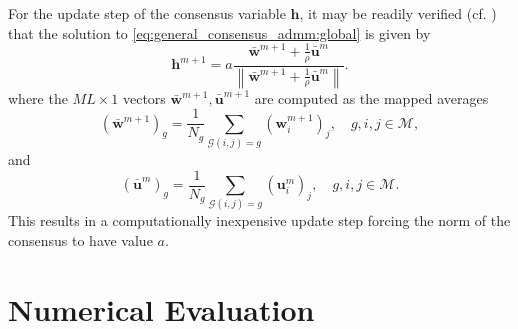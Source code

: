 \documentclass{article}
\newcommand{\hf}{{\bm{h}}}
\newcommand{\wf}{{\bm{w}}}
\newcommand{\uuf}{{\bm{u}}}
\newcommand{\Mset}{\mathcal{M}}
\begin{document}
For the update step of the consensus variable \(\hf\), it may be readily verified (cf. \cite{boydDistributedOptimizationStatistical2011}) that the solution to \eqref{eq:general_consensus_admm:global} is given by
\begin{equation}
    \hf^{m+1} = a\frac{\bar{\wf}^{m+1} + \frac{1}{\rho} \bar{\uuf}^{m} }{\left\| \bar{\wf}^{m+1} + \frac{1}{\rho} \bar{\uuf}^{m} \right\|}.\label{eq:online_admm:consensus_update}
\end{equation}
where the \(M L \times 1\) vectors \(\bar{\wf}^{m+1}, \bar{\uuf}^{m+1}\) are computed as the mapped averages
\begin{equation}
    (\bar{\wf}^{m+1})_g = \frac{1}{N_g} \sum_{\mathcal{G}(i,j)=g} (\wf_i^{m+1})_j,\quad g,i,j \in \Mset,
\end{equation}
and
\begin{equation}
    (\bar{\uuf}^{m})_g = \frac{1}{N_g} \sum_{\mathcal{G}(i,j)=g} (\uuf_i^{m})_j,\quad g,i,j \in \Mset.
\end{equation}
This results in a computationally inexpensive update step forcing the norm of the consensus to have value \(a\).

\section{Numerical Evaluation}
\label{sec:perf_eval}
\end{document}
